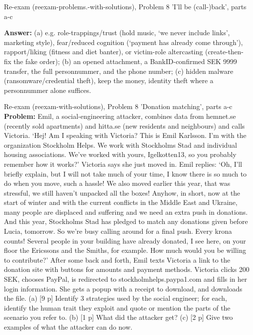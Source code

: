 \documentclass[12pt, a4paper]{article}
\begin{document}
\begin{practicebox}{Re-exam (reexam-problems.-with-solutions), Problem 8 'I'll be (call-)back', parts a-c}
\begin{itemize}
\end{itemize}
\textbf{Answer:} (a) e.g. role-trappings/trust (hold music, `we never include links', marketing style), fear/reduced cognition (`payment has already come through'), rapport/liking (fitness and diet banter), or victim-role altercasting (create-then-fix the fake order); (b) an opened attachment, a BankID-confirmed SEK 9999 transfer, the full personnummer, and the phone number; (c) hidden malware (ransomware/credential theft), keep the money, identity theft where a personnummer alone suffices.
\end{practicebox}

\begin{practicebox}{Re-exam (reexam-with-solutions), Problem 8 'Donation matching', parts a-c}
\textbf{Problem:} Emil, a social-engineering attacker, combines data from hemnet.se (recently sold apartments) and hitta.se (new residents and neighbours) and calls Victoria. `Hej! Am I speaking with Victoria? This is Emil Karlsson. I'm with the organization Stockholm Helps. We work with Stockholms Stad and individual housing associations. We've worked with yours, Igelkotten13, so you probably remember how it works?' Victoria says she just moved in. Emil replies: `Oh, I'll briefly explain, but I will not take much of your time, I know there is so much to do when you move, such a hassle! We also moved earlier this year, that was stressful, we still haven't unpacked all the boxes! Anyhow, in short, now at the start of winter and with the current conflicts in the Middle East and Ukraine, many people are displaced and suffering and we need an extra push in donations. And this year, Stockholms Stad has pledged to match any donations given before Lucia, tomorrow. So we're busy calling around for a final push. Every krona counts! Several people in your building have already donated, I see here, on your floor the Ericssons and the Smiths, for example. How much would you be willing to contribute?' After some back and forth, Emil texts Victoria a link to the donation site with buttons for amounts and payment methods. Victoria clicks 200 SEK, chooses PayPal, is redirected to stockholmhelps.paypa1.com and fills in her login information. She gets a popup with a receipt to download, and downloads the file. (a) [9 p] Identify 3 strategies used by the social engineer; for each, identify the human trait they exploit and quote or mention the parts of the scenario you refer to. (b) [1 p] What did the attacker get? (c) [2 p] Give two examples of what the attacker can do now.


\end{practicebox}
\end{document}
